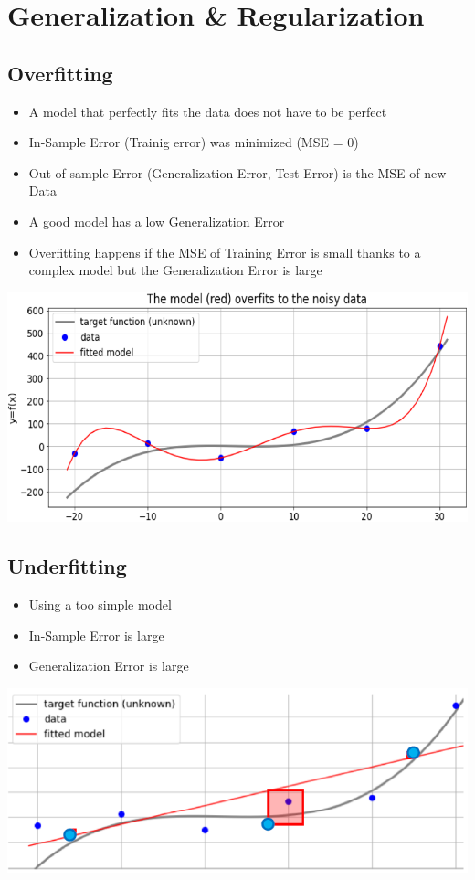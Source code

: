 \section{Generalization \& Regularization}
\subsection{Overfitting}
\begin{itemize}
    \item A model that perfectly fits the data does not have to be perfect
    \item In-Sample Error (Trainig error) was minimized (MSE = 0)
    \item Out-of-sample Error (Generalization Error, Test Error) is the MSE of new Data
    \item A good model has a low Generalization Error
    \item Overfitting happens if the MSE of Training Error is small thanks to a complex model but the Generalization Error is large
\end{itemize}
\includegraphics[width=0.9\linewidth]{./img/overfitting.png}

\subsection{Underfitting}
\begin{itemize}
    \item Using a too simple model
    \item In-Sample Error is large
    \item Generalization Error is large
\end{itemize}

\includegraphics[width=0.9\linewidth]{./img/underfitting.png}

